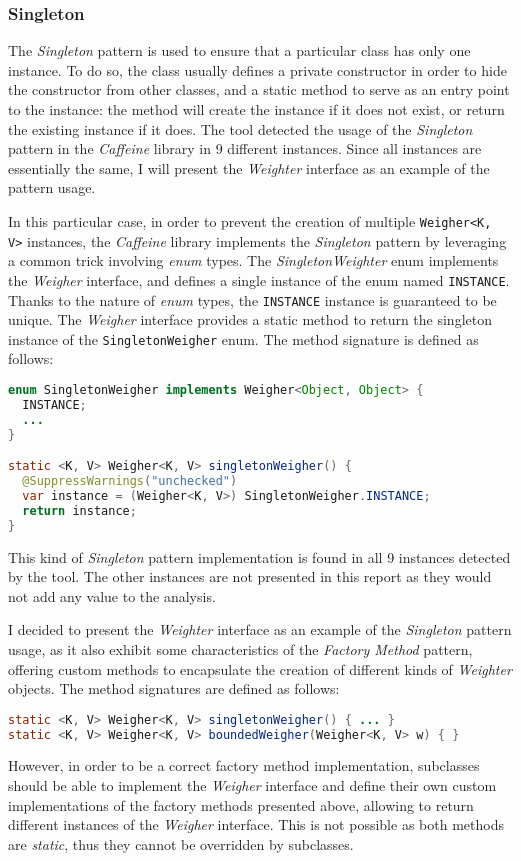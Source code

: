 \subsubsection{Singleton}
\label{sec:singleton}

The \textit{Singleton} pattern is used to ensure that a particular class has only one instance. To do so, the class usually defines a private constructor in order to hide the constructor from other classes, and a static method to serve as an entry point to the instance: the method will create the instance if it does not exist, or return the existing instance if it does. The tool detected the usage of the \textit{Singleton} pattern in the \textit{Caffeine} library in 9 different instances. Since all instances are essentially the same, I will present the \textit{Weighter} interface as an example of the pattern usage.

In this particular case, in order to prevent the creation of multiple \texttt{Weigher<K, V>} instances, the \textit{Caffeine} library implements the \textit{Singleton} pattern by leveraging a common trick involving \textit{enum} types. The \textit{SingletonWeighter} enum implements the \textit{Weigher} interface, and defines a single instance of the enum named \texttt{INSTANCE}. Thanks to the nature of \textit{enum} types, the \texttt{INSTANCE} instance is guaranteed to be unique. The \textit{Weigher} interface provides a static method to return the singleton instance of the \texttt{SingletonWeigher} enum. The method signature is defined as follows:

\begin{lstlisting}[language=Java]
enum SingletonWeigher implements Weigher<Object, Object> {
  INSTANCE;
  ...
}

static <K, V> Weigher<K, V> singletonWeigher() {
  @SuppressWarnings("unchecked")
  var instance = (Weigher<K, V>) SingletonWeigher.INSTANCE;
  return instance;
}
\end{lstlisting}

\noindent This kind of \textit{Singleton} pattern implementation is found in all 9 instances detected by the tool. The other instances are not presented in this report as they would not add any value to the analysis.

I decided to present the \textit{Weighter} interface as an example of the \textit{Singleton} pattern usage, as it also exhibit some characteristics of the \textit{Factory Method} pattern, offering custom methods to encapsulate the creation of different kinds of \textit{Weighter} objects. The method signatures are defined as follows:

\begin{lstlisting}[language=Java]
static <K, V> Weigher<K, V> singletonWeigher() { ... }
static <K, V> Weigher<K, V> boundedWeigher(Weigher<K, V> w) { }
\end{lstlisting}

\noindent However, in order to be a correct factory method implementation, subclasses should be able to implement the \textit{Weigher} interface and define their own custom implementations of the factory methods presented above, allowing to return different instances of the \textit{Weigher} interface. This is not possible as both methods are \textit{static}, thus they cannot be overridden by subclasses.
